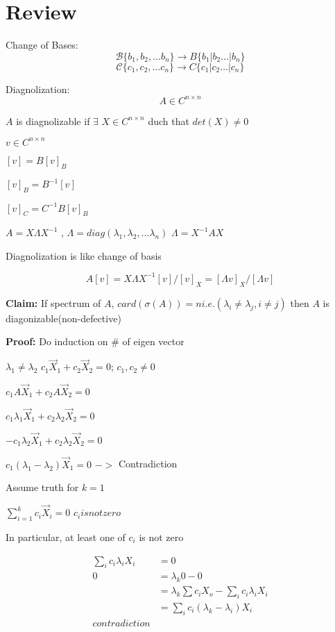 \documentclass{article}
\begin{document}
\section{Review}
Change of Bases: 
$$
\mathcal{B} \{b_1, b_2, \dots b_n \} \longrightarrow B \{b_1|b_2\dots|b_n\}
$$
$$
\mathcal{C} \{c_1, c_2, \dots c_n \} \longrightarrow C \{c_1|c_2\dots|c_n\}
$$


Diagnolization:
$$
A \in C^{n \times n}
$$

$A$ is diagnolizable if $\exists$ $X \in C^{n\times n}$ duch that $det (X) \neq 0$ 

$v \in C^{n \times n}$ 

$ [v] = B[v]_B$ 

$[v]_B = B^{-1}[v]$ 

$[v]_C = C^{-1}B[v]_B$


$A = X\Lambda X^{-1}$ , $\Lambda = diag(\lambda_1, \lambda_2, \dots \lambda_n)$
$\Lambda = X^{-1}AX$


Diagnolization is like change of basis

$$
A[v] = X\Lambda X^{-1}[v]/[v]_X = [\Lambda v]_X/[\Lambda v]
$$

\textbf{Claim: }If spectrum of $A$, $card(\sigma(A)) = n i.e.(\lambda_i \neq \lambda_j, i \neq j)$ then $A$ is diagonizable(non-defective)

\textbf{Proof:} Do induction on \# of eigen vector

$\lambda_1 \neq \lambda_2$
$c_1\vec{X}_1 + c_2\vec{X}_2 = 0$; $c_1,c_2 \neq 0$ 

$c_1A\vec{X}_1 + c_2A\vec{X}_2 =0$

$c_1\lambda_1\vec{X}_1 + c_2\lambda_2\vec{X}_2 =0$

$-c_1\lambda_2\vec{X}_1 + c_2\lambda_2\vec{X}_2 =0$

 $c_1(\lambda_1-\lambda_2)\vec{X}_1=0$ $->$ Contradiction
 
 Assume truth for $k=1$
 
 $\sum_{i=1}^k c_i \vec{X}_i = 0$ $c_i is not zero$
 
 In particular, at least one of $c_i$ is not zero
 
 \begin{align*}
\sum_{i}c_i\lambda_i X_i &= 0\\
0 &= \lambda_k 0 - 0\\
&= \lambda_k \sum c_iX_o - \sum_i c_i \lambda_i X_i\\
&= \sum_i c_i(\lambda_k - \lambda_i)X_i\\ contradiction
\end{align*}
\end{document}
